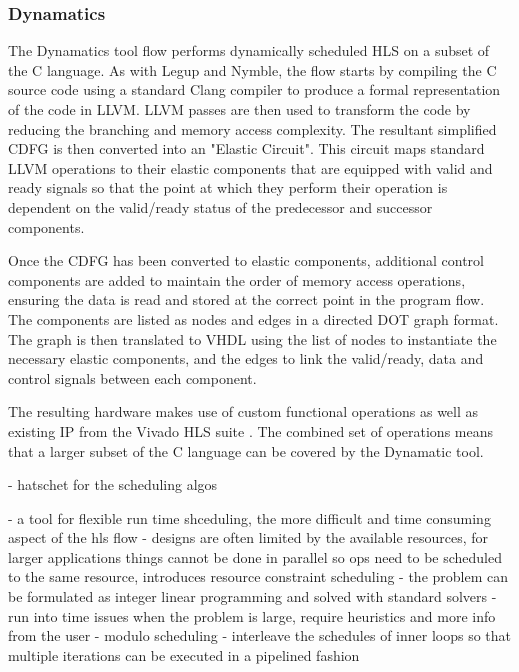
\subsubsection{Dynamatics} %

The Dynamatics \cite{dynamatics_p} tool flow performs dynamically scheduled HLS on a subset of the C language. As with Legup and Nymble, the flow starts by compiling the C source code using a standard Clang compiler to produce a formal representation of the code in LLVM. LLVM passes are then used to transform the code by reducing the branching and memory access complexity. The resultant simplified CDFG is then converted into an "Elastic Circuit". This circuit maps standard LLVM operations to their elastic components that are equipped with valid and ready signals so that the point at which they perform their operation is dependent on the valid/ready status of the predecessor and successor components. 

Once the CDFG has been converted to elastic components, additional control components are added to maintain the order of memory access operations, ensuring the data is read and stored at the correct point in the program flow. The components are listed as nodes and edges in a directed DOT graph format. The graph is then translated to VHDL using the list of nodes to instantiate the necessary elastic components, and the edges to link the valid/ready, data and control signals between each component.

The resulting hardware makes use of custom functional operations as well as existing IP from the Vivado HLS suite \cite{viv_hls}. The combined set of operations means that a larger subset of the C language can be covered by the Dynamatic tool.




















\iffalse
- hatschet for the scheduling algos

- a tool for flexible run time shceduling, the more difficult and time consuming aspect of the hls flow
- designs are often limited by the available resources, for larger applications things cannot be done in parallel so ops need to be scheduled to the same resource, introduces resource constraint scheduling
- the problem can be formulated as integer linear programming and solved with standard solvers
- run into time issues when the problem is large, require heuristics and more info from the user
- modulo scheduling - interleave the schedules of inner loops so that multiple iterations can be executed in a pipelined fashion

